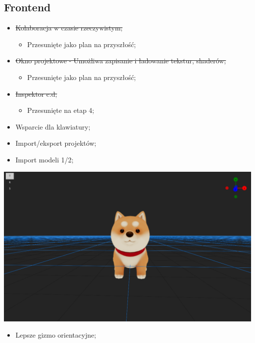 \documentclass[11pt]{article}
\begin{document}
\subsection{Frontend}
\label{sec:orgc34f8fb}
\begin{itemize}
\item \sout{Kolaboracja w czasie rzeczywistym;}
\begin{itemize}
\item Przesunięte jako plan na przyszłość;
\end{itemize}
\item \sout{Okno projektowe - Umożliwa zapisanie i ładowanie tekstur, shaderów;}
\begin{itemize}
\item Przesunięte jako plan na przyszłość;
\end{itemize}
\item \sout{Inspektor c.d;}
\begin{itemize}
\item Przesunięte na etap 4;
\end{itemize}
\item Wsparcie dla klawiatury;
\item Import/eksport projektów;
\item Import modeli 1/2;
\end{itemize}
\begin{center}
\includegraphics[width=.9\linewidth]{./img/model.jpg}
\end{center}
\begin{itemize}
\item Lepsze gizmo orientacyjne;
\end{itemize}
\end{document}
